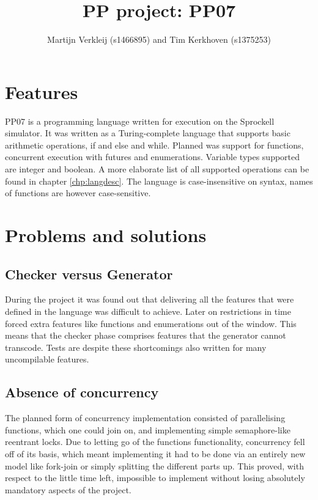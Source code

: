 \documentclass[10pt,a4paper]{report}
\author{Martijn Verkleij (s1466895) and Tim Kerkhoven (s1375253)}
\title{PP project: PP07}
\begin{document}
\maketitle
\tableofcontents


\chapter{Features}
PP07 is a programming language written for execution on the Sprockell simulator. It was written as a Turing-complete language that supports basic arithmetic operations, if and else and while. Planned was support for functions, concurrent execution with futures and enumerations. Variable types supported are integer and boolean. A more elaborate list of all supported operations can be found in chapter \ref{chp:langdesc}. The language is case-insensitive on syntax, names of functions are however case-sensitive. 

\chapter{Problems and solutions}
\section{Checker versus Generator}
During the project it was found out that delivering all the features that were defined in the language was difficult to achieve. Later on restrictions in time forced extra features like functions and enumerations out of the window. This means that the checker phase comprises features that the generator cannot transcode. Tests are despite these shortcomings also written for many uncompilable features.

\section{Absence of concurrency}
The planned form of concurrency implementation consisted of parallelising functions, which one could join on, and implementing simple semaphore-like reentrant locks. Due to letting go of the functions functionality, concurrency fell off of its basis, which meant implementing it had to be done via an entirely new model like fork-join or simply splitting the different parts up. This proved, with respect to the little time left, impossible to implement without losing absolutely mandatory aspects of the project.
\end{document}
